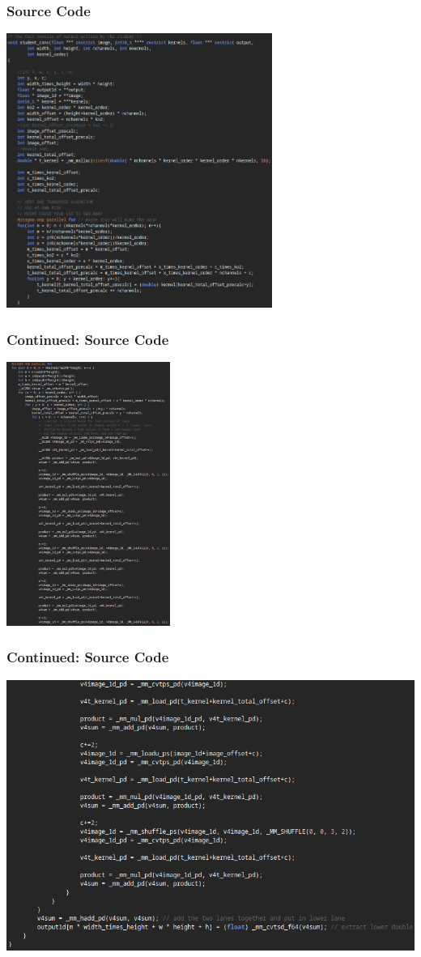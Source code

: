 \documentclass{beamer}
\begin{document}
\begin{frame}[fragile]
\frametitle{Source Code}
\includegraphics[width=0.65\textwidth]{images/student-conv-part1}
\end{frame}

\begin{frame}[fragile]
\frametitle{Continued: Source Code}
\includegraphics[width=0.4\textwidth]{images/student-conv-part2}
\end{frame}

\begin{frame}[fragile]
\frametitle{Continued: Source Code}
\includegraphics[width=1\textwidth]{images/student-conv-part3}
\end{frame}
\end{document}
